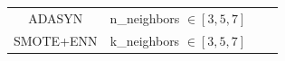 \documentclass[runningheads]{llncs}
\begin{document}
\begin{table}[tb]
\begin{tabular}{cccc}
  ADASYN           & \multicolumn{1}{c|}{n\_neighbors $\in [3,5,7]$}                                                                                                                                                         &                                                       &                                                                                                                                                              \\ \cline{1-2}
  SMOTE+ENN        & \multicolumn{1}{c|}{k\_neighbors $\in [3,5,7]$}                                                                                                                                                         &                                                       &                                                                                                                                                              \\ \hline
  \end{tabular}
  \end{table}
\end{document}
